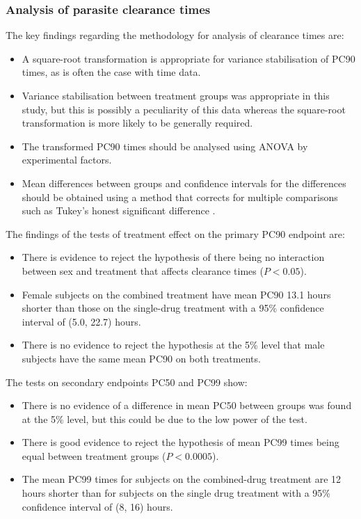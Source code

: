 \subsubsection{Analysis of parasite clearance times}
The key findings regarding the methodology for analysis of clearance times are:
\begin{itemize}
\item A square-root transformation is appropriate for variance stabilisation of PC90 times, as is often the case with time data.
\item Variance stabilisation between treatment groups was appropriate in this study, but this is possibly a peculiarity of this data whereas the square-root transformation is more likely to be generally required.
\item The transformed PC90 times should be analysed using ANOVA by experimental factors.
\item Mean differences between groups and confidence intervals for the differences should be obtained using a method that corrects for multiple comparisons such as Tukey's honest significant difference \cite{montgomery}.
\end{itemize}
The findings of the tests of treatment effect on the primary PC90 endpoint are:
\begin{itemize}
\item There is evidence to reject the hypothesis of there being no interaction between sex and treatment that affects clearance times ($P<0.05$).
\item Female subjects on the combined treatment have mean PC90 13.1 hours shorter than those on the single-drug treatment with a 95\% confidence interval of (5.0, 22.7) hours.
\item There is no evidence to reject the hypothesis at the 5\% level that male subjects have the same mean PC90 on both treatments.
\end{itemize}
The tests on secondary endpoints PC50 and PC99 show:
\begin{itemize}
\item There is no evidence of a difference in mean PC50 between groups was found at the 5\% level, but this could be due to the low power of the test.
\item There is good evidence to reject the hypothesis of mean PC99 times being equal between treatment groups ($P<0.0005$).
\item The mean PC99 times for subjects on the combined-drug treatment are 12 hours shorter than for subjects on the single drug treatment with a 95\% confidence interval of (8, 16) hours.
\end{itemize}

